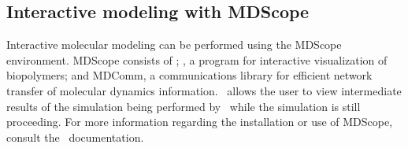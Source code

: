 
\subsection{Interactive modeling with MDScope}

Interactive molecular modeling can be performed using the MDScope
environment.  MDScope consists of \NAMD; \VMD, a program for
interactive visualization of biopolymers; and MDComm, a communications
library for efficient network transfer of molecular dynamics
information.  \VMD\ allows the user to view intermediate results of the
simulation being performed by \NAMD\ while the simulation is still 
proceeding.  For more information regarding 
the installation or use of MDScope, 
consult the \VMD\ documentation.  

